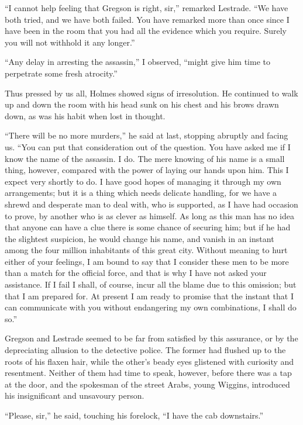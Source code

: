 \documentclass[12pt]{book}
\begin{document}
“I cannot help feeling that Gregson is right, sir,” remarked Lestrade. “We have both tried, and we have both failed. You have remarked more than once since I have been in the room that you had all the evidence which you require. Surely you will not withhold it any longer.” 

“Any delay in arresting the assassin,” I observed, “might give him time to perpetrate some fresh atrocity.” 

Thus pressed by us all, Holmes showed signs of irresolution. He continued to walk up and down the room with his head sunk on his chest and his brows drawn down, as was his habit when lost in thought. 

“There will be no more murders,” he said at last, stopping abruptly and facing us. “You can put that consideration out of the question. You have asked me if I know the name of the assassin. I do. The mere knowing of his name is a small thing, however, compared with the power of laying our hands upon him. This I expect very shortly to do. I have good hopes of managing it through my own arrangements; but it is a thing which needs delicate handling, for we have a shrewd and desperate man to deal with, who is supported, as I have had occasion to prove, by another who is as clever as himself. As long as this man has no idea that anyone can have a clue there is some chance of securing him; but if he had the slightest suspicion, he would change his name, and vanish in an instant among the four million inhabitants of this great city. Without meaning to hurt either of your feelings, I am bound to say that I consider these men to be more than a match for the official force, and that is why I have not asked your assistance. If I fail I shall, of course, incur all the blame due to this omission; but that I am prepared for. At present I am ready to promise that the instant that I can communicate with you without endangering my own combinations, I shall do so.” 

Gregson and Lestrade seemed to be far from satisfied by this assurance, or by the depreciating allusion to the detective police. The former had flushed up to the roots of his flaxen hair, while the other’s beady eyes glistened with curiosity and resentment. Neither of them had time to speak, however, before there was a tap at the door, and the spokesman of the street Arabs, young Wiggins, introduced his insignificant and unsavoury person. 

“Please, sir,” he said, touching his forelock, “I have the cab downstairs.” 
\end{document}
